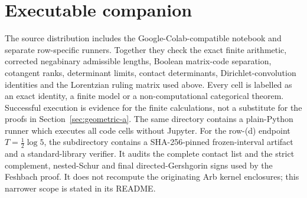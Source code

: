 \documentclass[11pt]{amsart}
\theoremstyle{definition}
\theoremstyle{remark}
\begin{document}
\begin{center}
\end{center}


\section*{Executable companion}

The source distribution includes the Google-Colab-compatible notebook
 and separate
row-specific runners.  Together they check the exact finite arithmetic,
corrected negabinary admissible lengths, Boolean matrix-code separation,
cotangent ranks, determinant limits, contact determinants,
Dirichlet-convolution identities and the Lorentzian ruling matrix used above.
Every cell is labelled as an exact identity, a finite model or a
non-computational categorical theorem.  Successful execution is evidence for
the finite calculations, not a substitute for the proofs in
Section~\ref{sec:geometric-a}.  The same directory contains a plain-Python runner
which executes all code cells without Jupyter.
For the row-(d) endpoint \(T=\frac12\log5\), the subdirectory
 contains a SHA-256-pinned frozen-interval
artifact and a standard-library verifier.  It audits the complete contact
list and the strict complement, nested-Schur and final directed-Gershgorin
signs used by the Feshbach proof.  It does not recompute the originating Arb
kernel enclosures; this narrower scope is stated in its README.
\end{document}
